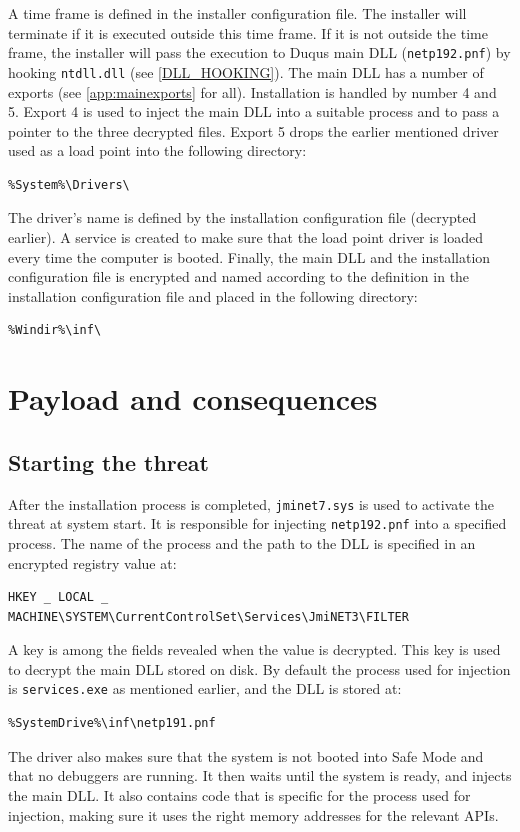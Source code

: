 \documentclass[11pt,english,a4paper]{report}
\begin{document}
A time frame is defined in the installer configuration file. The installer will terminate if it is executed outside this time frame. If it is not outside the time frame, the installer will pass the execution to Duqus main DLL (\texttt{netp192.pnf}) by hooking \texttt{ntdll.dll} (see \ref{DLL_HOOKING}). The main DLL has a number of exports (see \ref{app:mainexports} for all). Installation is handled by number 4 and 5. Export 4 is used to inject the main DLL into a suitable process and to pass a pointer to the three decrypted files. Export 5 drops the earlier mentioned driver used as a load point into the following directory:
\begin{lstlisting}
%System%\Drivers\ 
\end{lstlisting}
The driver's name is defined by the installation configuration file (decrypted earlier). A service is created to make sure that the load point driver is loaded every time the computer is booted. Finally, the main DLL and the installation configuration file is encrypted and named according to the definition in the installation configuration file and placed in the following directory:
\begin{lstlisting}
%Windir%\inf\ 
\end{lstlisting}

\chapter{Payload and consequences}
\section{Starting the threat}
After the installation process is completed, \texttt{jminet7.sys} is used to activate the threat at system start. It is responsible for injecting \texttt{netp192.pnf} into a specified process. The name of the process and the path to the DLL is specified in an encrypted registry value at:
\begin{lstlisting}
HKEY _ LOCAL _ MACHINE\SYSTEM\CurrentControlSet\Services\JmiNET3\FILTER
\end{lstlisting}
A key is among the fields revealed when the value is decrypted. This key is used to decrypt the main DLL stored on disk. By default the process used for injection is \texttt{services.exe} as mentioned earlier, and the DLL is stored at:
\begin{lstlisting}
%SystemDrive%\inf\netp191.pnf 
\end{lstlisting}
The driver also makes sure that the system is not booted into Safe Mode and that no debuggers are running. It then waits until the system is ready, and injects the main DLL. It also contains code that is specific for the process used for injection, making sure it uses the right memory addresses for the relevant APIs.
\end{document}
